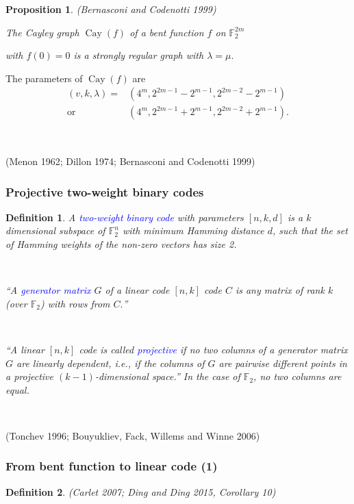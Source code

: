 \documentclass[pdf,sprung,slideColor,nocolorBG]{beamer}
\newenvironment{colortheme}[1]{
\def\ProvidesPackageRCS $##1${\relax}
\renewcommand{\ProcessOptions}{\relax}
\makeatletter

\makeatother
}{}
\newcommand{\slidecite}[1]{\tiny{(#1)}\normalsize{}}
\newcommand{\smallcite}[1]{\small{(#1)}\normalsize{}}
\newcommand{\mb}[1]{\mathbb{#1}}
\newcommand{\Emph}[1]{\emph{\textcolor{blue}{#1}}}
\newcommand{\Cay}[1]{\operatorname{Cay}\left(#1\right)}
\newcommand{\F}{\mb{F}}
\newtheorem{Def}{Definition}
\newtheorem{Proposition}{Proposition}
\begin{document}
\begin{colortheme}{seagull}
\begin{frame}
\begin{Proposition}
\smallcite{Bernasconi and Codenotti 1999}

The Cayley graph $\Cay{f}$ of a bent function $f$ on $\F_2^{2m}$

with $f(0)=0$ is a strongly regular graph with $\lambda = \mu.$
\end{Proposition}

The parameters of $\Cay{f}$ are
\begin{align*}
(v,k,\lambda) = &(4^m, 2^{2 m - 1} - 2^{m-1}, 2^{2 m - 2} - 2^{m-1})
\\
  \text{or} \quad &(4^m, 2^{2 m - 1} + 2^{m-1}, 2^{2 m - 2} + 2^{m-1}).
\end{align*}

~

\slidecite{Menon 1962; Dillon 1974; Bernasconi and Codenotti 1999}
\end{frame}

\begin{frame}
\frametitle{Projective two-weight binary codes}

\begin{Def}
A \Emph{two-weight binary code} with parameters $[n,k,d]$ is a $k$ dimensional subspace of $\F_2^n$
with
minimum Hamming distance $d$, such that the set of Hamming weights of the non-zero vectors has size
2.

~

``A \Emph{generator matrix} $G$ of a linear code $[n, k]$ code $C$ is any matrix
of rank $k$ (over $\F_2$) with rows from $C.$''

~

``A linear $[n, k]$ code is called \Emph{projective} if no two columns of a generator matrix
$G$ are linearly dependent, i.e., if the columns of $G$ are pairwise different points in a
projective $(k-1)$-dimensional space.''
In the case of $\F_2$, no two columns are equal.

~

\end{Def}

\slidecite{Tonchev 1996; Bouyukliev, Fack, Willems and Winne 2006}

\end{frame}

\begin{frame}
\frametitle{From bent function to linear code (1)}
\begin{Def}

\smallcite{Carlet 2007; Ding and Ding 2015, Corollary 10}


\end{Def}
\end{frame}
\end{colortheme}
\end{document}

